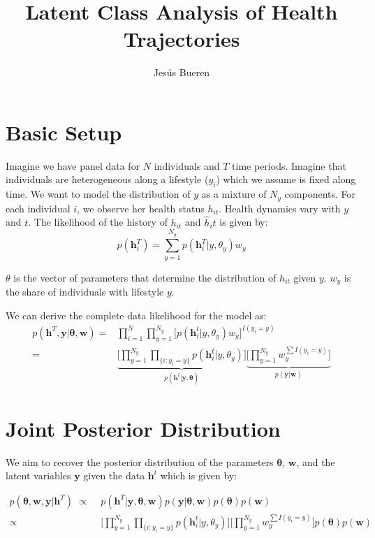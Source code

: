 \documentclass{article}
\begin{document}
\title{Latent Class Analysis of Health Trajectories}
\author{Jes{\'u}s Bueren}
\maketitle

\section{Basic Setup}
Imagine we have panel data for $N$ individuals and $T$ time periods. Imagine that individuals are heterogeneous along a lifestyle ($y_i$) which we assume is fixed along time. We want to model the distribution of $y$ as a mixture of $N_y$ components. For each individual $i$, we observe her health status $h_{it}$. Health dynamics vary with $y$ and $t$. The likelihood of the history of $h_{it}$ and $\hat{h}_it$ is given by:
\begin{equation}
    p(\bm{h}_i^T)=\sum_{y=1}^{N_y} p(\bm{h}_i^T|y,\theta_y)w_y
\end{equation}

$\theta$ is the vector of parameters that determine the distribution of $h_{it}$ given $y$. $w_y$ is the share of individuals with lifestyle $y$.

We can derive the complete data likelihood for the model as:
\begin{align}
    p(\bm{h}^T,\bm{y}|\bm{\theta},\bm{w})=&\prod_{i=1}^N\prod_{y=1}^{N_y}\Big[p(\bm{h}_i^t|y,\theta_y)w_y\Big]^{I(y_i=y)}\\
=&\underbrace{\Big[\prod_{y=1}^{N_y}\prod_{\lbrace i: y_i=y \rbrace} p(\bm{h}_i^t|y,\theta_y)\Big]}_{p(\bm{h}^t|\bm{y},\bm{\theta})} \underbrace{\Big[\prod_{y=1}^{N_y} w_y^{\sum I(y_i=y)}\Big]}_{p(\bm{y}|\bm{w})}
\end{align}

\section{Joint Posterior Distribution}

We aim to recover the posterior distribution of the parameters $\bm{\theta}$, $\bm{w}$, and the latent variables $\bm{y}$ given the data $\bm{h}^t$ which is given by:

\begin{align}
    p(\bm{\theta},\bm{w},\bm{y}|\bm{h}^T)\,\,\propto\,\,& p(\bm{h}^T|\bm{y},\bm{\theta},\bm{w})p(\bm{y}|\bm{\theta},\bm{w})p(\bm{\theta})p(\bm{w})\\
    \propto\,\,& \Big[\prod_{y=1}^{N_y}\prod_{\lbrace i: y_i=y \rbrace} p(\bm{h}_i^t|y,\theta_y)\Big] \Big[\prod_{y=1}^{N_y} w_y^{\sum I(y_i=y)}\Big] p(\bm{\theta})p(\bm{w})
\end{align}
\end{document}
